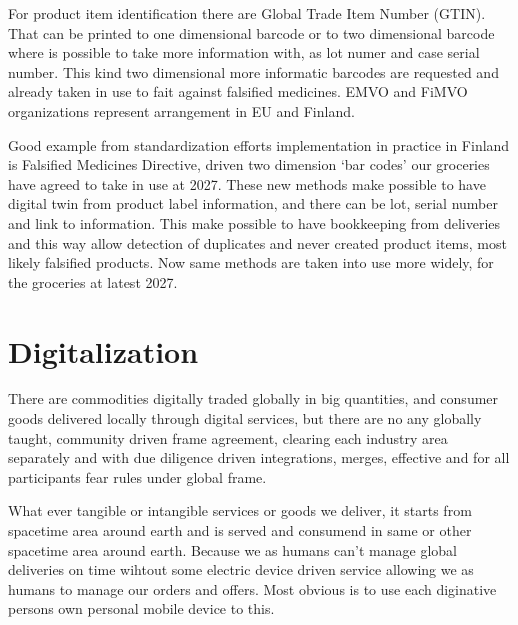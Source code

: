 For product item identification there are Global Trade Item Number
(GTIN)\allowbreak\cite{GTIN}. That can be printed to one dimensional barcode
or to two dimensional barcode where is possible to take more information with,
as lot numer and case serial number. This kind two dimensional more informatic
barcodes are requested and already taken in use to fait against falsified
medicines\allowbreak\cite{FalsifiedMedicines}. EMVO\allowbreak\cite{EMVO} and
FiMVO\allowbreak\cite{FiMVO} organizations represent arrangement in EU and
Finland.

Good example from standardization efforts implementation in practice in
Finland is Falsified Medicines Directive\allowbreak\cite{
Falsified_Medicines_Directive}\allowbreak\cite{
FalsifiedMedicines}\allowbreak\cite{EMVO}\allowbreak\cite{FiMVO}, driven two
dimension `bar codes' our groceries have agreed to take in use at
2027\allowbreak\cite{GS1DL2027}\allowbreak\cite{Finland2DcodesY27}. These new
methods make possible to have digital twin from product label information, and
there can be lot, serial number and link to information. This make possible to
have bookkeeping from deliveries and this way allow detection of duplicates
and never created product items, most likely falsified products. Now same
methods are taken into use more widely, for the groceries\allowbreak\cite{
Remix30QRcode} at latest 2027.

\section{Digitalization}\label{digitalization}
There are commodities digitally traded globally in big quantities, and
consumer goods delivered locally through digital services, but there are no
any globally taught, community driven frame agreement, clearing each industry
area separately and with due diligence driven integrations, merges, effective
and for all participants fear rules under global frame.

What ever tangible or intangible services or goods we deliver, it starts from
spacetime area around earth and is served and consumend in same or other
spacetime area around earth. Because we as humans can't manage global
deliveries on time wihtout some electric device driven service allowing we as
humans to manage our orders and offers. Most obvious is to use each diginative
persons own personal mobile device to this.

